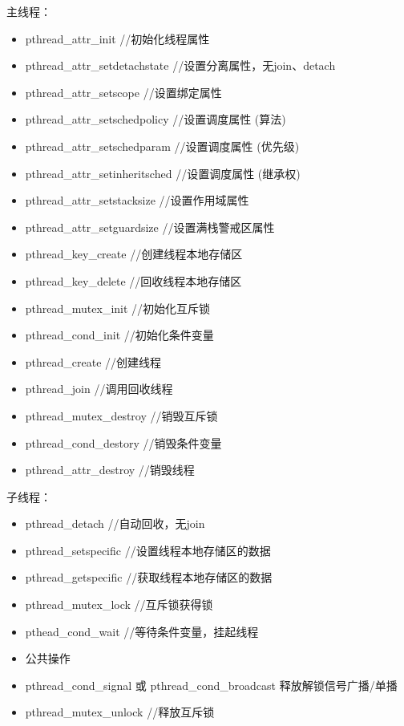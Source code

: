 \documentclass[UTF8]{article}%
\begin{document}
主线程：

\begin{itemize}
    \item pthread\_attr\_init  //初始化线程属性
    \item pthread\_attr\_setdetachstate //设置分离属性，无join、detach
    \item pthread\_attr\_setscope //设置绑定属性
    \item pthread\_attr\_setschedpolicy //设置调度属性 (算法)
    \item pthread\_attr\_setschedparam //设置调度属性 (优先级)
    \item pthread\_attr\_setinheritsched //设置调度属性 (继承权)
    \item pthread\_attr\_setstacksize //设置作用域属性
    \item pthread\_attr\_setguardsize //设置满栈警戒区属性
    \item pthread\_key\_create //创建线程本地存储区
    \item pthread\_key\_delete //回收线程本地存储区
    \item pthread\_mutex\_init //初始化互斥锁
    \item pthread\_cond\_init //初始化条件变量
    \item pthread\_create //创建线程
    \item pthread\_join  //调用回收线程
    \item pthread\_mutex\_destroy //销毁互斥锁
    \item pthread\_cond\_destory //销毁条件变量
    \item pthread\_attr\_destroy  //销毁线程
\end{itemize}

子线程：

\begin{itemize}
    \item pthread\_detach //自动回收，无join
    \item pthread\_setspecific //设置线程本地存储区的数据
    \item pthread\_getspecific //获取线程本地存储区的数据
    \item pthread\_mutex\_lock //互斥锁获得锁
    \item pthead\_cond\_wait //等待条件变量，挂起线程
    \item 公共操作
    \item pthread\_cond\_signal 或 pthread\_cond\_broadcast 释放解锁信号广播/单播
    \item pthread\_mutex\_unlock //释放互斥锁
\end{itemize}
\end{document}
